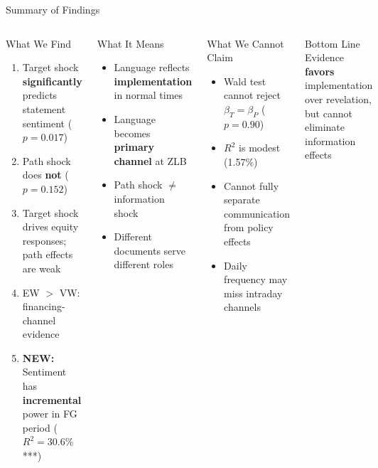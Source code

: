 \documentclass[aspectratio=169, 11pt]{beamer}
\begin{document}
\begin{frame}{Summary of Findings}
\begin{columns}[T]
\begin{ablock}{What We Find}
\begin{enumerate}
  \item Target shock \textbf{significantly} predicts statement sentiment ($p = 0.017$)
  \item Path shock does \textbf{not} ($p = 0.152$)
  \item Target shock drives equity responses; path effects are weak
  \item EW $>$ VW: financing-channel evidence
  \item \textbf{NEW:} Sentiment has \textbf{incremental} power in FG period ($R^2 = 30.6\%$***)
\end{enumerate}
\end{ablock}

\begin{ablock}{What It Means}
\begin{itemize}
  \item Language reflects \textbf{implementation} in normal times
  \item Language becomes \textbf{primary channel} at ZLB
  \item Path shock $\neq$ information shock
  \item Different documents serve different roles
\end{itemize}
\end{ablock}

\begin{aalertblock}{What We Cannot Claim}
\begin{itemize}
  \item Wald test cannot reject $\beta_T = \beta_P$ ($p = 0.90$)
  \item $R^2$ is modest (1.57\%)
  \item Cannot fully separate communication from policy effects
  \item Daily frequency may miss intraday channels
\end{itemize}
\end{aalertblock}
\vspace{0.2em}
\begin{aexampleblock}{Bottom Line}
Evidence \textbf{favors} implementation over revelation, but cannot eliminate information effects
\end{aexampleblock}
\end{columns}
\end{frame}
\end{document}
